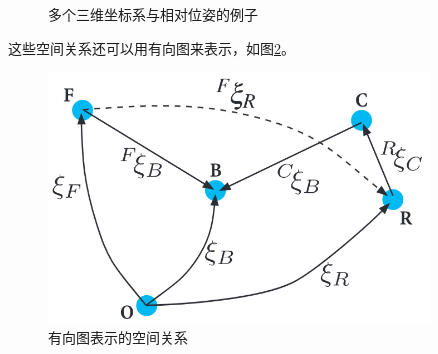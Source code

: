 \documentclass[UTF8,a4paper,10pt]{ctexart}
\begin{document}
\begin{itemize}
\begin{figure}[htbp]
    \caption{多个三维坐标系与相对位姿的例子}
    \label{fig:multiple_frame_pose}
  \end{figure}
  这些空间关系还可以用有向图来表示，如图\ref{fig:pose_directed_graph}。
  \begin{figure}[htbp]
    \centerline{\includegraphics[width=0.9\textwidth]{pose_directed_graph}}
    \caption{有向图表示的空间关系}
    \label{fig:pose_directed_graph}
  \end{figure}
  

\end{itemize}
\end{document}
